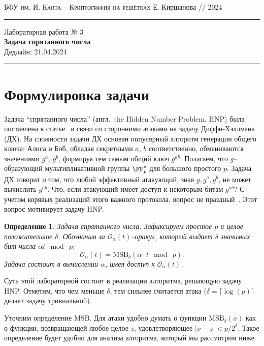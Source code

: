 \documentclass[11pt]{exam}
\newtheorem{definition}[theorem]{Определение}
\theoremstyle{definition}
\newcommand{\bigO}{\mathcal{O}}
\begin{document}
	{\noindent
		\textsc{БФУ им. И. Канта -- Криптография на решётках}
		\hfill {Е. Киршанова // 2024}
\hrule
\begin{center}
	{\LARGE
			Лабораторная работа № 3 \\[5pt]
			\textbf{
				Задача спрятанного числа 
			} \\[10pt]
	 	{Дедлайн: 21.04.2024} 
 	} 
\end{center}
\hrule \vspace{5mm}
	
	\thispagestyle{empty}
	
	\vspace{0.2cm}
	\section{Формулировка задачи}
	Задача ``спрятанного числа'' (англ.\ the Hidden Number Problem, HNP) была поставлена в статье~\cite{BV} в связи со сторонними атаками на задачу Диффи-Хэллмана (ДХ). На сложности задачи ДХ основан популярный алгоритм генерации общего ключа: Алиса и Боб, обладая секретными $a$, $b$ соответственно, обмениваются значениями $g^a$, $g^b$, формируя тем самым общий ключ $g^{ab}$. Полагаем, что $g$–образующий мультипликативной группы $\FF_p^\star$ для большого простого $p$. Задача ДХ говорит о том, что любой эффективный атакующий, зная $g,g^a,g^b$, не может вычислить $g^{ab}$. Что, если атакующий имеет доступ к некоторым битам $g^{ab}$? С учетом корявых реализаций этого важного протокола, вопрос не праздный~\cite{MB+}. Этот вопрос мотивирует задачу HNP.
	\begin{definition}
	 Задача спрятанного числа. Зафиксируем простое $p$ и целое положительное $\delta$. Обозначим за $\bigO_\alpha(t)$–оракул, который выдает $\delta$ значимых бит числа $\alpha t~\bmod~p$:
	 \[
	 	\bigO_\alpha(t) = \mathrm{MSB}_{\delta}(\alpha \cdot t~\bmod~p).
	 \]
	Задача состоит в вычислении $\alpha$, имея доступ к $\bigO_\alpha(t)$.
	\end{definition}

	Суть этой лабораторной состоит в реализации алгоритма, решающую задачу HNP. Отметим, что чем меньше $\delta$, тем сильнее считается атака ($\delta = \lceil \log(p)\rceil$ делает задачу тривиальной).
	
	Уточним определение $\mathrm{MSB}$. Для атаки удобно думать о функции $\mathrm{MSB}_{\delta}(x)$ как о функции, возвращающей любое целое $z$, удовлетворяющее $|x-z| < p/2^\delta$. Такое определение будет удобно для анализа алгоритма, который мы рассмотрим ниже.
	
}
\end{document}
